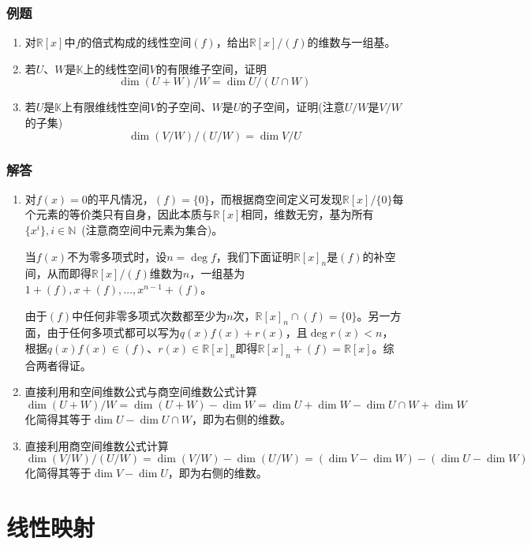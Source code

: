 \documentclass[a4paper,UTF8,fontset=windows,AutoFakeBold]{ctexart}
\begin{document}
\subsubsection{例题}
\begin{enumerate}
    \item 对$\mathbb{R}[x]$中$f$的倍式构成的线性空间$(f)$，给出$\mathbb{R}[x]/(f)$的维数与一组基。
    \item 若$U$、$W$是$\mathbb{K}$上的线性空间$V$的有限维子空间，证明
    $$\dim(U+W)/W=\dim U/(U\cap W)$$
    \item 若$U$是$\mathbb{K}$上有限维线性空间$V$的子空间、$W$是$U$的子空间，证明(注意$U/W$是$V/W$的子集)
    $$\dim(V/W)/(U/W)=\dim V/U$$
\end{enumerate}

\subsubsection{解答}
\begin{enumerate}
    \item 对$f(x)=0$的平凡情况，$(f)=\{0\}$，而根据商空间定义可发现$\mathbb{R}[x]/\{0\}$每个元素的等价类只有自身，因此本质与$\mathbb{R}[x]$相同，维数无穷，基为所有$\{x^i\},i\in\mathbb{N}$\ (注意商空间中元素为集合)。
    
    当$f(x)$不为零多项式时，设$n=\deg f$，我们下面证明$\mathbb{R}[x]_n$是$(f)$的补空间，从而即得$\mathbb{R}[x]/(f)$维数为$n$，一组基为$1+(f),x+(f),\dots,x^{n-1}+(f)$。

    由于$(f)$中任何非零多项式次数都至少为$n$次，$\mathbb{R}[x]_n\cap(f)=\{0\}$。另一方面，由于任何多项式都可以写为$q(x)f(x)+r(x)$，且$\deg r(x)<n$，根据$q(x)f(x)\in(f)$、$r(x)\in\mathbb{R}[x]_n$即得$\mathbb{R}[x]_n+(f)=\mathbb{R}[x]$。综合两者得证。

    \item 直接利用和空间维数公式与商空间维数公式计算
    $$\dim(U+W)/W=\dim(U+W)-\dim W=\dim U+\dim W-\dim U\cap W+\dim W$$
    化简得其等于$\dim U-\dim U\cap W$，即为右侧的维数。

    \item 直接利用商空间维数公式计算
    $$\dim(V/W)/(U/W)=\dim(V/W)-\dim(U/W)=(\dim V-\dim W)-(\dim U-\dim W)$$
    化简得其等于$\dim V-\dim U$，即为右侧的维数。   
\end{enumerate}

\section{线性映射}
\end{document}
